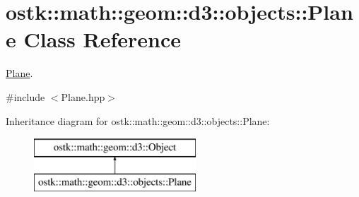 \hypertarget{classostk_1_1math_1_1geom_1_1d3_1_1objects_1_1_plane}{}\section{ostk\+:\+:math\+:\+:geom\+:\+:d3\+:\+:objects\+:\+:Plane Class Reference}
\label{classostk_1_1math_1_1geom_1_1d3_1_1objects_1_1_plane}


\hyperlink{classostk_1_1math_1_1geom_1_1d3_1_1objects_1_1_plane}{Plane}.  




{\ttfamily \#include $<$Plane.\+hpp$>$}

Inheritance diagram for ostk\+:\+:math\+:\+:geom\+:\+:d3\+:\+:objects\+:\+:Plane\+:\begin{figure}[H]
\begin{center}
\leavevmode
\includegraphics[height=2.000000cm]{classostk_1_1math_1_1geom_1_1d3_1_1objects_1_1_plane}
\end{center}
\end{figure}
